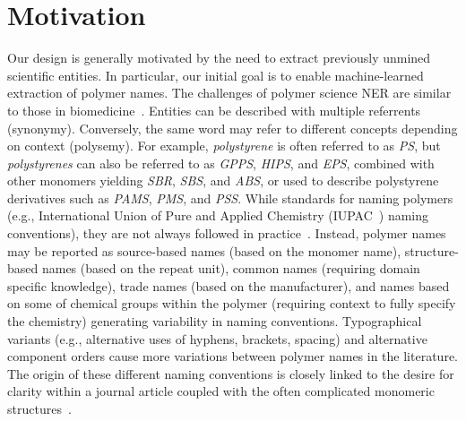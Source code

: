 \section{Motivation}
\label{sect:background}
Our design is generally motivated by the need to extract previously unmined scientific entities. 
In particular, our initial goal is to enable machine-learned extraction of polymer names. 
The challenges of polymer science NER are similar to those in biomedicine~\cite{krallinger2015chemdner,kim2004introduction}. 
Entities can be described with multiple referrents (synonymy).
Conversely, the same word may refer to different concepts depending on context (polysemy).
For example,
\textit{polystyrene} is often referred to as \textit{PS}, but \textit{polystyrenes} can also be referred to as \textit{GPPS}, \textit{HIPS}, and \textit{EPS}, combined with other monomers yielding \textit{SBR}, \textit{SBS}, and \textit{ABS}, or used to describe polystyrene derivatives such as \textit{PAMS}, \textit{PMS}, and \textit{PSS}.
While standards for naming polymers (e.g., International Union of Pure and Applied Chemistry (IUPAC~\cite{hiorns2013brief}) naming conventions), they are not always followed in practice~\cite{tamames2006success}. 
Instead, polymer names may be reported as source-based names (based on the monomer name), structure-based names (based on the repeat unit), common names (requiring domain specific knowledge), trade names (based on the manufacturer), and names based on some of chemical groups within the polymer (requiring context to fully specify the chemistry) generating variability in naming conventions.
Typographical variants (e.g., alternative uses of hyphens, brackets, spacing) and alternative component orders cause more variations between polymer names in the literature.
The origin of these different naming conventions is closely linked to the desire for clarity within a journal article coupled with the often complicated monomeric structures~\cite{audus2017polymer}.
